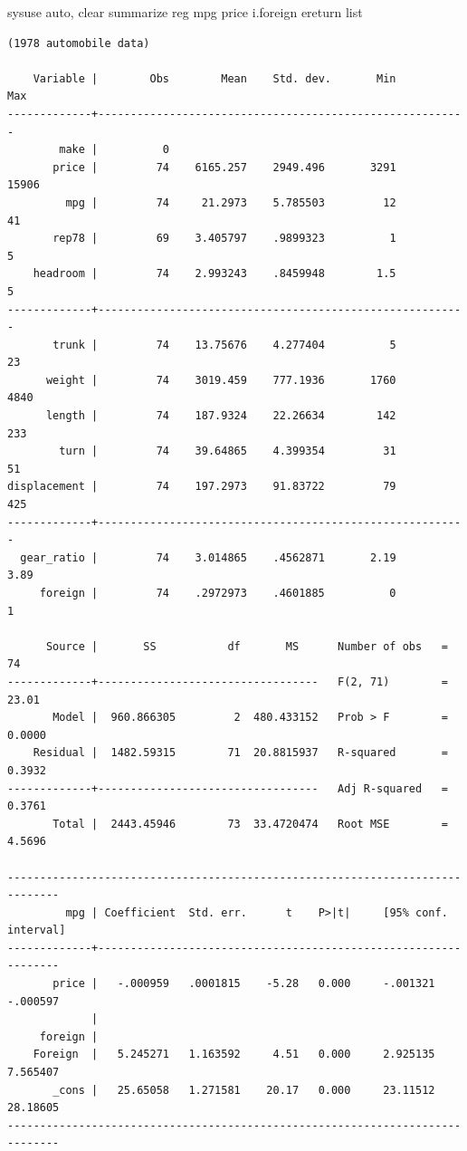 \documentclass[
  letterpaper,
  DIV=11,
  numbers=noendperiod]{scrartcl}
\newenvironment{Shaded}{\begin{snugshade}}{\end{snugshade}}
\newcommand{\KeywordTok}[1]{\textcolor[rgb]{0.00,0.23,0.31}{#1}}
\newcommand{\NormalTok}[1]{\textcolor[rgb]{0.00,0.23,0.31}{#1}}
\newcommand{\OtherTok}[1]{\textcolor[rgb]{0.00,0.23,0.31}{#1}}
\begin{document}
\begin{Shaded}
\begin{Highlighting}[]
\KeywordTok{sysuse}\NormalTok{ auto, }\KeywordTok{clear}
\KeywordTok{summarize}
\KeywordTok{reg}\NormalTok{ mpg price i.foreign}
\KeywordTok{ereturn} \OtherTok{list}
\end{Highlighting}
\end{Shaded}

\begin{verbatim}
(1978 automobile data)

    Variable |        Obs        Mean    Std. dev.       Min        Max
-------------+---------------------------------------------------------
        make |          0
       price |         74    6165.257    2949.496       3291      15906
         mpg |         74     21.2973    5.785503         12         41
       rep78 |         69    3.405797    .9899323          1          5
    headroom |         74    2.993243    .8459948        1.5          5
-------------+---------------------------------------------------------
       trunk |         74    13.75676    4.277404          5         23
      weight |         74    3019.459    777.1936       1760       4840
      length |         74    187.9324    22.26634        142        233
        turn |         74    39.64865    4.399354         31         51
displacement |         74    197.2973    91.83722         79        425
-------------+---------------------------------------------------------
  gear_ratio |         74    3.014865    .4562871       2.19       3.89
     foreign |         74    .2972973    .4601885          0          1

      Source |       SS           df       MS      Number of obs   =        74
-------------+----------------------------------   F(2, 71)        =     23.01
       Model |  960.866305         2  480.433152   Prob > F        =    0.0000
    Residual |  1482.59315        71  20.8815937   R-squared       =    0.3932
-------------+----------------------------------   Adj R-squared   =    0.3761
       Total |  2443.45946        73  33.4720474   Root MSE        =    4.5696

------------------------------------------------------------------------------
         mpg | Coefficient  Std. err.      t    P>|t|     [95% conf. interval]
-------------+----------------------------------------------------------------
       price |   -.000959   .0001815    -5.28   0.000     -.001321    -.000597
             |
     foreign |
    Foreign  |   5.245271   1.163592     4.51   0.000     2.925135    7.565407
       _cons |   25.65058   1.271581    20.17   0.000     23.11512    28.18605
------------------------------------------------------------------------------



\end{verbatim}
\end{document}
